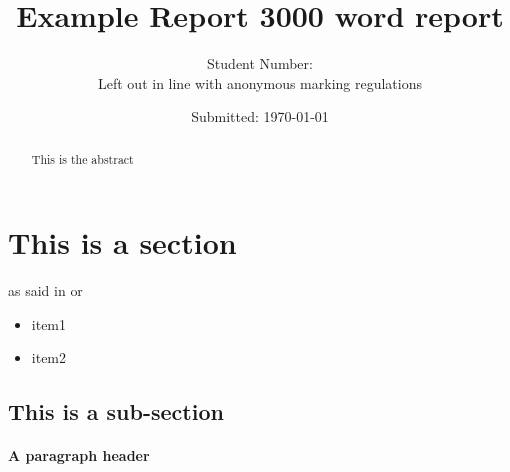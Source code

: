 \documentclass[a4paper,11pt]{article}
\begin{document}
%
   \title{Example Report \vfill
   \vfill 3000 word report}
   \author{Student Number:  \\ Left out in line with anonymous marking regulations}
   \date{Submitted: \today}

   \maketitle
   \newpage
   \tableofcontents
 
  \newpage


\begin{abstract}
 This is the abstract
\end{abstract}
\section{This is a section}
\blindtext

as said in \citet{bainbridge_intellectual_2012} or \citep{bainbridge_intellectual_2012}
\citet{noauthor_patrick_2016}

\begin{itemize}
   \item item1
   \item item2
\end{itemize}

\subsection{This is a sub-section}
\paragraph{A paragraph header}

\newpage
\listoftables

\newpage
\listoffigures

\newpage


\end{document}
